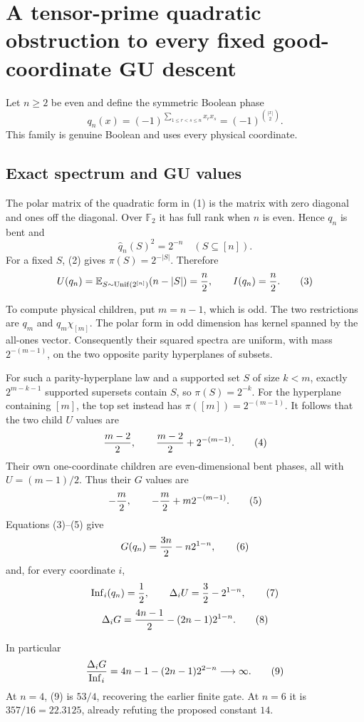 \section*{A tensor-prime quadratic obstruction to every fixed good-coordinate GU descent}

Let $n\ge2$ be even and define the symmetric Boolean phase
\[
 q_n(x)=(-1)^{\sum_{1\le r<s\le n}x_rx_s}
       =(-1)^{\binom{|x|}{2}}.                         \tag{1}
\]
This family is genuine Boolean and uses every physical coordinate.

\subsection*{Exact spectrum and GU values}

The polar matrix of the quadratic form in (1) is the matrix with zero
diagonal and ones off the diagonal.  Over $\mathbb F_2$ it has full rank
when $n$ is even.  Hence $q_n$ is bent and
\[
 \widehat q_n(S)^2=2^{-n}\quad(S\subseteq[n]).          \tag{2}
\]
For a fixed $S$, (2) gives $\pi(S)=2^{-|S|}$.  Therefore
\[
 U(q_n)=\mathbb E_{S\sim\mathrm{Unif}(2^{[n]})}(n-|S|)
       ={n\over2},\qquad I(q_n)={n\over2}.             \tag{3}
\]

To compute physical children, put $m=n-1$, which is odd.  The two
restrictions are $q_m$ and $q_m\chi_{[m]}$.  The polar form in odd dimension
has kernel spanned by the all-ones vector.  Consequently their squared
spectra are uniform, with mass $2^{-(m-1)}$, on the two opposite parity
hyperplanes of subsets.

For such a parity-hyperplane law and a supported set $S$ of size $k<m$,
exactly $2^{m-k-1}$ supported supersets contain $S$, so $\pi(S)=2^{-k}$.
For the hyperplane containing $[m]$, the top set instead has
$\pi([m])=2^{-(m-1)}$.  It follows that the two child $U$ values are
\[
 {m-2\over2},\qquad {m-2\over2}+2^{-(m-1)}.            \tag{4}
\]
Their own one-coordinate children are even-dimensional bent phases, all
with $U=(m-1)/2$.  Thus their $G$ values are
\[
 -{m\over2},\qquad -{m\over2}+m2^{-(m-1)}.             \tag{5}
\]
Equations (3)--(5) give
\[
 G(q_n)={3n\over2}-n2^{1-n},                           \tag{6}
\]
and, for every coordinate $i$,
\[
 \operatorname{Inf}_i(q_n)={1\over2},\qquad
 \Delta_iU={3\over2}-2^{1-n},                         \tag{7}
\]
\[
 \Delta_iG={4n-1\over2}-(2n-1)2^{1-n}.                \tag{8}
\]

In particular
\[
 {\Delta_iG\over\operatorname{Inf}_i}
 =4n-1-(2n-1)2^{2-n}\longrightarrow\infty.            \tag{9}
\]
At $n=4$, (9) is $53/4$, recovering the earlier finite gate.  At $n=6$ it
is $357/16=22.3125$, already refuting the proposed constant $14$.

